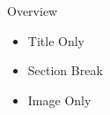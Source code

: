 \begin{SlideTitleContent}{Overview}
    \begin{itemize}
        \item Title Only
        \item Section Break
        \item Image Only
    \end{itemize}
\end{SlideTitleContent}
